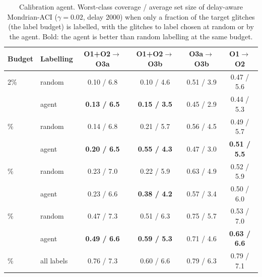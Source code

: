 \begin{table}[!htbp]
\caption{Calibration agent. Worst-class coverage / average set size of delay-aware Mondrian-ACI ($\gamma=0.02$, delay 2000)
when only a fraction of the target glitches (the label budget) is labelled, with the glitches to label chosen at random or by the
agent. Bold: the agent is better than random labelling at the same budget.}\label{tab:e9}
\centering\footnotesize\setlength{\tabcolsep}{4pt}
\begin{tabular}{llcccc}\toprule
Budget & Labelling & O1+O2$\rightarrow$O3a & O1+O2$\rightarrow$O3b & O3a$\rightarrow$O3b & O1$\rightarrow$O2\\\midrule
2\% & random & 0.10 / 6.8 & 0.10 / 4.6 & 0.51 / 3.9 & 0.47 / 5.6\\
 & agent & \textbf{0.13 / 6.5} & \textbf{0.15 / 3.5} & 0.45 / 2.9 & 0.44 / 5.3\\
\addlinespace[2pt]
5\% & random & 0.14 / 6.8 & 0.21 / 5.7 & 0.56 / 4.5 & 0.49 / 5.7\\
 & agent & \textbf{0.20 / 6.5} & \textbf{0.55 / 4.3} & 0.47 / 3.0 & \textbf{0.51 / 5.5}\\
\addlinespace[2pt]
10\% & random & 0.23 / 7.0 & 0.22 / 5.9 & 0.63 / 4.9 & 0.52 / 5.9\\
 & agent & 0.23 / 6.6 & \textbf{0.38 / 4.2} & 0.57 / 3.4 & 0.50 / 6.0\\
\addlinespace[2pt]
25\% & random & 0.47 / 7.3 & 0.51 / 6.3 & 0.75 / 5.7 & 0.53 / 7.0\\
 & agent & \textbf{0.49 / 6.6} & \textbf{0.59 / 5.3} & 0.71 / 4.6 & \textbf{0.63 / 6.6}\\
\addlinespace[2pt]
100\% & all labels & 0.76 / 7.3 & 0.60 / 6.6 & 0.79 / 6.3 & 0.79 / 7.1\\
\bottomrule
\end{tabular}
\end{table}
